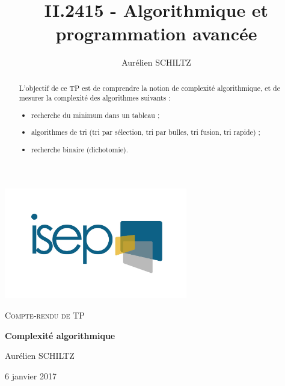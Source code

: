 \newcommand*{\ROOT}{./src}



\graphicspath{{\ROOT/}{\ROOT/img/}}


\title{II.2415 - Algorithmique et programmation avancée}
\author{Aurélien SCHILTZ}

\makeatletter
{}
\makeatother



\begin{titlepage}
	\centering
	\includegraphics[width=8cm]{logo}
	\par
	\vspace{4cm}

	{\scshape\Large Compte-rendu de TP\par}
	\vspace{1.5cm}
	{\huge\bfseries Complexité algorithmique \par}
	\vspace{2cm}
	{\Large Aurélien SCHILTZ\par}
	\vfill\par
	\par
	\vfill

	{\large 6 janvier 2017}
\end{titlepage}


\newpage
\begin{abstract}

  L'objectif de ce TP est de comprendre la notion de complexité algorithmique, et de mesurer la complexité des algorithmes suivants :
  \begin{itemize}
    \item recherche du minimum dans un tableau ;
    \item algorithmes de tri (tri par sélection, tri par bulles, tri fusion, tri rapide) ;
    \item recherche binaire (dichotomie).
  \end{itemize}

\end{abstract}

